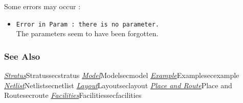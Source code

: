 Some errors may occur :
\begin{itemize}
    \item \verb-Error in Param : there is no parameter.-\\The parameters seem to have been forgotten.
\end{itemize}

\subsubsection{See Also}

\hyperref[ref]{\emph{Stratus}}{}{Stratus}{secstratus}
\hyperref[ref]{\emph{Model}}{}{Model}{secmodel}
\hyperref[ref]{\emph{Example}}{}{Example}{secexample}
\hyperref[ref]{\emph{Netlist}}{}{Netlist}{secnetlist}
\hyperref[ref]{\emph{Layout}}{}{Layout}{seclayout}
\hyperref[ref]{\emph{Place and Route}}{}{Place and Route}{secroute}
\hyperref[ref]{\emph{Facilities}}{}{Facilities}{secfacilities}

